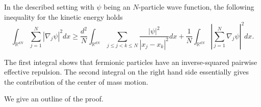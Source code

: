 \begin{theorem}
  In the described setting with $\psi$ being an $N$-particle wave function, the following inequality for the kinetic energy holds
  \begin{equation}\label{eq:fermion ineq}
    \int_{\mathbb{R}^{dN}} \sum_{j=1}^N |\nabla_j \psi|^2 dx \ge
    \frac{d^2}{N} \int_{\mathbb{R}^{dN}} \sum_{j \le j < k \le N} \frac{|\psi|^2}{|x_j-x_k|^2} dx +
    \frac{1}{N} \int_{\mathbb{R}^{dN}} \left|\sum_{j=1}^N \nabla_j \psi \right|^2 dx.
  \end{equation}
\end{theorem}

The first integral shows that fermionic particles have an inverse-squared pairwise effective repulsion. The second integral on the right hand side essentially gives the contribution of the center of mass motion.

We give an outline of the proof.

